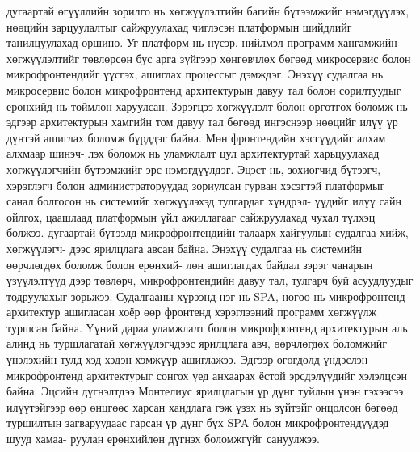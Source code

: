 \newline
\hspace*{1cm}\cite{tilak2020} дугаартай өгүүллийн зорилго нь хөгжүүлэлтийн багийн бүтээмжийг нэмэгдүүлэх, нөөцийн зарцуулалтыг сайжруулахад чиглэсэн платформын шийдлийг танилцуулахад оршино. Уг платформ нь нүсэр, нийлмэл программ хангамжийн хөгжүүлэлтийг төвлөрсөн бус арга зүйгээр хөнгөвчлөх бөгөөд микросервис болон микрофронтендийг үүсгэх, ашиглах процессыг дэмждэг. Энэхүү судалгаа нь микросервис болон микрофронтенд архитектурын давуу тал болон сорилтуудыг ерөнхийд нь тоймлон харуулсан. Зэрэгцээ хөгжүүлэлт болон өргөтгөх боломж нь эдгээр архитектурын хамгийн том давуу тал бөгөөд ингэснээр нөөцийг илүү үр дүнтэй ашиглах боломж бүрддэг байна. Мөн фронтендийн хэсгүүдийг алхам алхмаар шинэч- лэх боломж нь уламжлалт цул архитектуртай харьцуулахад хөгжүүлэгчийн бүтээмжийг эрс нэмэгдүүлдэг. Эцэст нь, зохиогчид бүтээгч, хэрэглэгч болон администраторуудад зориулсан гурван хэсэгтэй платформыг санал болгосон нь системийг хөгжүүлэхэд тулгардаг хүндрэл- үүдийг илүү сайн ойлгох, цаашлаад платформын үйл ажиллагааг сайжруулахад чухал түлхэц болжээ.
\newline
\hspace*{1cm}\cite{montelius2021} дугаартай бүтээлд микрофронтендийн талаарх хайгуулын судалгаа хийж, хөгжүүлэгч- дээс ярилцлага авсан байна. Энэхүү судалгаа нь системийн өөрчлөгдөх боломж болон ерөнхий- лөн ашиглагдах байдал зэрэг чанарын үзүүлэлтүүд дээр төвлөрч, микрофронтендийн давуу тал, тулгарч буй асуудлуудыг тодруулахыг зорьжээ. Судалгааны хүрээнд нэг нь SPA, нөгөө нь микрофронтенд архитектур ашигласан хоёр өөр фронтенд хэрэглээний программ хөгжүүлж туршсан байна. Үүний дараа уламжлалт болон микрофронтенд архитектурын аль алинд нь туршлагатай хөгжүүлэгчдээс ярилцлага авч, өөрчлөгдөх боломжийг үнэлэхийн тулд хэд хэдэн хэмжүүр ашиглажээ. Эдгээр өгөгдөлд үндэслэн микрофронтенд архитектурыг сонгох үед анхаарах ёстой эрсдэлүүдийг хэлэлцсэн байна. Эцсийн дүгнэлтдээ Монтелиус ярилцлагын үр дүнг туйлын үнэн гэхээсээ илүүтэйгээр өөр өнцгөөс харсан хандлага гэж үзэх нь зүйтэйг онцолсон бөгөөд туршилтын загваруудаас гарсан үр дүнг бүх SPA болон микрофронтендүүдэд шууд хамаа- руулан ерөнхийлөн дүгнэх боломжгүйг сануулжээ.

